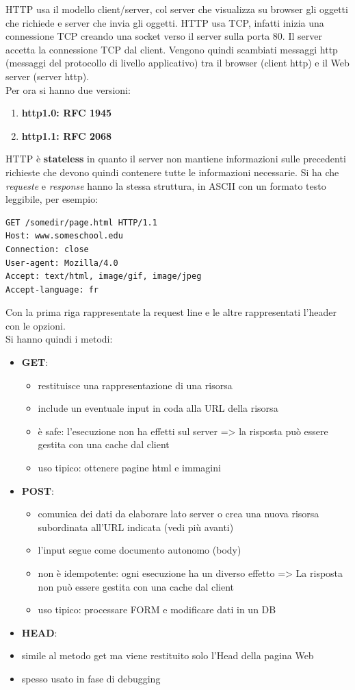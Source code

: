 \documentclass[a4paper,12pt, oneside]{book}
\begin{document}
HTTP usa il modello client/server, col server che visualizza su browser gli oggetti che richiede e server che invia gli oggetti. HTTP usa TCP, infatti inizia una connessione TCP creando una socket verso il server sulla porta 80. Il server accetta la connessione TCP dal client. Vengono quindi scambiati messaggi http (messaggi del protocollo
di livello applicativo) tra il browser (client http) e il Web
server (server http).\\
Per ora si hanno due versioni:
\begin{enumerate}
\item\textbf{ http1.0: RFC 1945}
\item\textbf{ http1.1: RFC 2068}
\end{enumerate}
HTTP è \textbf{stateless} in quanto il server non mantiene informazioni sulle precedenti richieste che devono quindi contenere tutte le informazioni necessarie. Si ha che \textit{requeste }e \textit{response} hanno la stessa struttura, in ASCII con un formato testo leggibile, per esempio:
\begin{verbatim}
GET /somedir/page.html HTTP/1.1
Host: www.someschool.edu
Connection: close
User-agent: Mozilla/4.0
Accept: text/html, image/gif, image/jpeg
Accept-language: fr
\end{verbatim}
Con la prima riga rappresentate la request line e le altre rappresentati l'header con le opzioni.\\
Si hanno quindi i metodi:
\begin{itemize}
\item \textbf{GET}:
\begin{itemize}
\item restituisce una rappresentazione di una risorsa
\item include un eventuale input in coda alla URL della risorsa
\item è safe: l'esecuzione non ha effetti sul server
=> la risposta può essere gestita con una cache dal client
\item uso tipico: ottenere pagine html e immagini
\end{itemize}
\item \textbf{POST}:
\begin{itemize}
\item comunica dei dati da elaborare lato server o crea una nuova risorsa
subordinata all’URL indicata (vedi più avanti)
\item l'input segue come documento autonomo (body)
\item non è idempotente: ogni esecuzione ha un diverso effetto
=> La risposta non può essere gestita con una cache dal client
\item uso tipico: processare FORM e modificare dati in un DB
\end{itemize}
\item \textbf{HEAD}:
\item simile al metodo get ma viene restituito solo l’Head della pagina Web
\item spesso usato in fase di debugging
\end{itemize}
\end{document}
